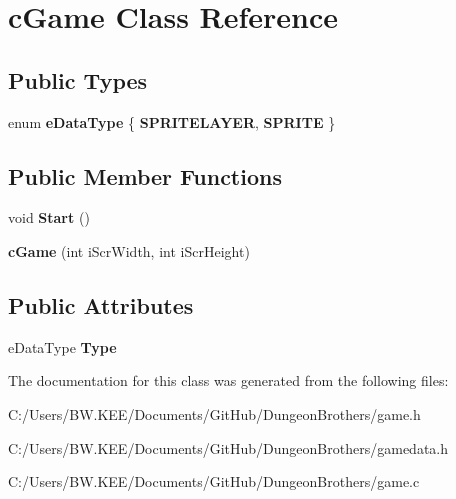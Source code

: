 \hypertarget{classc_game}{\section{c\-Game Class Reference}
\label{classc_game}
}
\subsection*{Public Types}
\begin{DoxyCompactItemize}
\item 
enum {\bfseries e\-Data\-Type} \{ {\bfseries S\-P\-R\-I\-T\-E\-L\-A\-Y\-E\-R}, 
{\bfseries S\-P\-R\-I\-T\-E}
 \}
\end{DoxyCompactItemize}
\subsection*{Public Member Functions}
\begin{DoxyCompactItemize}
\item 
\hypertarget{classc_game_aacd692d88029466a0ae346b022f5c7b4}{void {\bfseries Start} ()}\label{classc_game_aacd692d88029466a0ae346b022f5c7b4}

\item 
\hypertarget{classc_game_a3f1b9d09b77e67cdcb1c22492f3400a0}{{\bfseries c\-Game} (int i\-Scr\-Width, int i\-Scr\-Height)}\label{classc_game_a3f1b9d09b77e67cdcb1c22492f3400a0}

\end{DoxyCompactItemize}
\subsection*{Public Attributes}
\begin{DoxyCompactItemize}
\item 
\hypertarget{classc_game_a93aa23090d4531fffe232507f762b7e8}{e\-Data\-Type {\bfseries Type}}\label{classc_game_a93aa23090d4531fffe232507f762b7e8}

\end{DoxyCompactItemize}


The documentation for this class was generated from the following files\-:\begin{DoxyCompactItemize}
\item 
C\-:/\-Users/\-B\-W.\-K\-E\-E/\-Documents/\-Git\-Hub/\-Dungeon\-Brothers/game.\-h\item 
C\-:/\-Users/\-B\-W.\-K\-E\-E/\-Documents/\-Git\-Hub/\-Dungeon\-Brothers/gamedata.\-h\item 
C\-:/\-Users/\-B\-W.\-K\-E\-E/\-Documents/\-Git\-Hub/\-Dungeon\-Brothers/game.\-c\end{DoxyCompactItemize}
